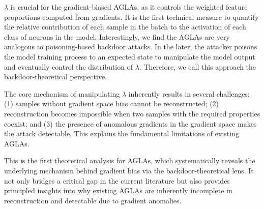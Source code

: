$\lambda$ is crucial for the gradient-biased AGLAs, as it controls the weighted feature proportions computed from gradients. It is the first technical measure to quantify the relative contribution of each sample in the batch to the activation of each class of neurons in the model. Interestingly, we find the AGLAs are very analogous to poisoning-based backdoor attacks. In the later, the attacker poisons the model training process to an expected state to manipulate the model output and eventually control the distribution of $\lambda$. Therefore, we call this approach the backdoor-theoretical perspective.

The core mechanism of manipulating $\lambda$ inherently results in several challenges: (1) samples without gradient space bias cannot be reconstructed; (2) reconstruction becomes impossible when two samples with the required properties coexist; and (3) the presence of anomalous gradients in the gradient space makes the attack detectable. This explains the fundamental limitations of existing AGLAs. 

This is the first theoretical analysis for AGLAs, which systematically reveals the underlying mechanism behind gradient bias via the backdoor-theoretical lens. It not only bridges a critical gap in the current literature but also provides principled insights into why existing AGLAs are inherently incomplete in reconstruction and detectable due to gradient anomalies.



